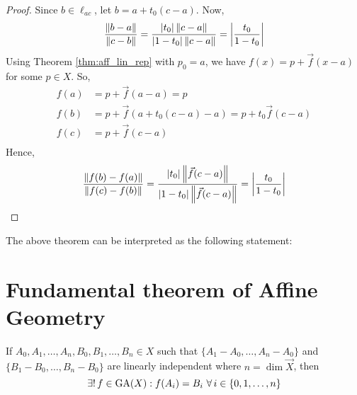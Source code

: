 \begin{proof}
    Since $b\in\ell_{ac}$, let $b=a+t_0(c-a)$. Now,
    \begin{align*}
        \frac{\left\lVert{b-a}\right\rVert}{\left\lVert{c-b}\right\rVert} = \frac{|t_0| \left\lVert{c-a}\right\rVert}{|1-t_0|\left\lVert{c-a}\right\rVert}
                                      = \left|\frac{t_0}{1-t_0}\right|
    \end{align*}
    Using Theorem \ref{thm:aff_lin_rep} with $p_0=a$, we have
    $f(x)=p+\vec{f}(x-a)$ for some $p \in X$. So,
    \begin{align*}
        f(a) &= p+\vec{f}(a-a) = p \\
        f(b) &= p+\vec{f}(a+t_0 (c-a)-a) = p + t_0 \vec{f}(c-a) \\
        f(c) &= p+\vec{f}(c-a) \\
    \end{align*}
    Hence,
    \begin{align*}
        \frac{\left\lVert{f(b)-f(a)}\right\rVert}{\left\lVert{f(c)-f(b)}\right\rVert}
        = \frac{|t_0| \left\lVert{\vec{f}(c-a)}\right\rVert}{|1-t_0|\left\lVert{\vec{f}(c-a)}\right\rVert}
        = \left|\frac{t_0}{1-t_0}\right|
    \end{align*}
\end{proof}

The above theorem can be interpreted as the following statement:
\vspace{1ex}

\begin{center}
\end{center}
\vspace{1ex}

\section{Fundamental theorem of Affine Geometry}

\begin{theorem}
    If $A_0,A_1,\dots,A_n,B_0,B_1,\dots,B_n \in X$ such that
    $\{A_1-A_0,\dots,A_n-A_0\}$ and $\{B_1-B_0,\dots,B_n-B_0\}$ are linearly
    independent where $n = \dim \vec{X}$, then
    \[ \exists!\,f\in\GA(X): f(A_i) = B_i\ \forall\,i\in\{0,1,\dots,n\} \]
\end{theorem}

